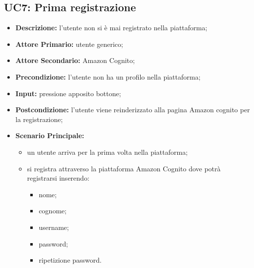         \subsection{UC7: Prima registrazione}
        \label{sec:UC7}
        \begin{itemize}
            \item \textbf{Descrizione:} l'utente non si è mai registrato nella piattaforma;
            \item \textbf{Attore Primario:} utente generico;
            \item \textbf{Attore Secondario:} Amazon Cognito;
            \item \textbf{Precondizione:} l'utente non ha un profilo nella piattaforma;
            \item \textbf{Input:} pressione apposito bottone;
            \item \textbf{Postcondizione:} l'utente viene reinderizzato alla pagina Amazon cognito per la registrazione;
            \item \textbf{Scenario Principale:}
            \begin{itemize}
                \item un utente arriva per la prima volta nella piattaforma;
                \item si registra attraverso la piattaforma Amazon Cognito dove potrà registrarsi inserendo:
                \begin{itemize}
                    \item nome;
                    \item cognome;
                    \item username;
                    \item password;
                    \item ripetizione password.
                \end{itemize}
            \end{itemize} 
        \end{itemize}
